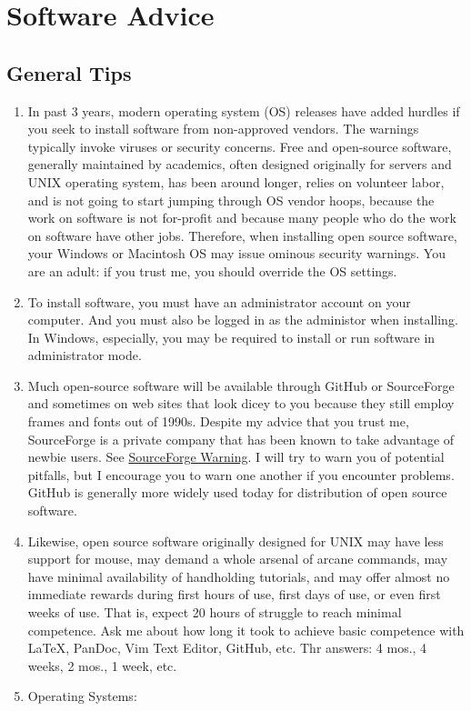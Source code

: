 \documentclass[]{article}
\begin{document}
\section{Software Advice}\label{software-advice}

\subsection{General Tips}\label{general-tips}

\begin{enumerate}
\def\labelenumi{\arabic{enumi}.}
\itemsep1pt\parskip0pt
\item
  In past 3 years, modern operating system (OS) releases have added
  hurdles if you seek to install software from non-approved vendors. The
  warnings typically invoke viruses or security concerns. Free and
  open-source software, generally maintained by academics, often
  designed originally for servers and UNIX operating system, has been
  around longer, relies on volunteer labor, and is not going to start
  jumping through OS vendor hoops, because the work on software is not
  for-profit and because many people who do the work on software have
  other jobs. Therefore, when installing open source software, your
  Windows or Macintosh OS may issue ominous security warnings. You are
  an adult: if you trust me, you should override the OS settings.\\
\item
  To install software, you must have an administrator account on your
  computer. And you must also be logged in as the administor when
  installing. In Windows, especially, you may be required to install or
  run software in administrator mode.
\item
  Much open-source software will be available through GitHub or
  SourceForge and sometimes on web sites that look dicey to you because
  they still employ frames and fonts out of 1990s. Despite my advice
  that you trust me, SourceForge is a private company that has been
  known to take advantage of newbie users. See
  \href{http://www.gluster.org/2013/08/how-far-the-once-mighty-sourceforge-has-fallen/}{SourceForge
  Warning}. I will try to warn you of potential pitfalls, but I
  encourage you to warn one another if you encounter problems. GitHub is
  generally more widely used today for distribution of open source
  software.
\item
  Likewise, open source software originally designed for UNIX may have
  less support for mouse, may demand a whole arsenal of arcane commands,
  may have minimal availability of handholding tutorials, and may offer
  almost no immediate rewards during first hours of use, first days of
  use, or even first weeks of use. That is, expect 20 hours of struggle
  to reach minimal competence. Ask me about how long it took to achieve
  basic competence with LaTeX, PanDoc, Vim Text Editor, GitHub, etc. Thr
  answers: 4 mos., 4 weeks, 2 mos., 1 week, etc.
\item
  Operating Systems:
\end{enumerate}
\end{document}
